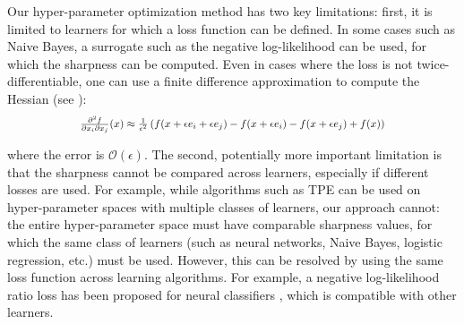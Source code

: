 \documentclass[preprint,12pt]{elsarticle}
\begin{document}
Our hyper-parameter optimization method has two key limitations: first, it is limited to learners for which a loss function can be defined. In some cases such as Naive Bayes, a surrogate such as the negative log-likelihood can be used, for which the sharpness can be computed. Even in cases where the loss is not twice-differentiable, one can use a finite difference approximation to compute the Hessian (see \citet{nocedal1999numerical}):
\begin{equation*}
\scalebox{0.85}{$
\frac{\partial^2 f}{\partial x_i \partial x_j}(x) \approx \frac{1}{\epsilon^2}\left( f(x + \epsilon e_i + \epsilon e_j) - f(x + \epsilon e_i) - f(x + \epsilon e_j) + f(x) \right)
$}
\end{equation*}

where the error is $\mathcal{O}(\epsilon)$. The second, potentially more important limitation is that the sharpness cannot be compared across learners, especially if different losses are used. For example, while algorithms such as TPE can be used on hyper-parameter spaces with multiple classes of learners, our approach cannot: the entire hyper-parameter space must have comparable sharpness values, for which the same class of learners (such as neural networks, Naive Bayes, logistic regression, etc.) must be used. However, this can be resolved by using the same loss function across learning algorithms. For example, a negative log-likelihood ratio loss has been proposed for neural classifiers \cite{yao2020negative}, which is compatible with other learners.





\end{document}
